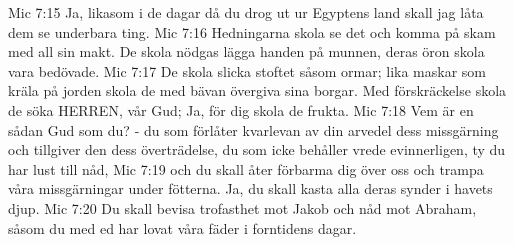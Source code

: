 Mic 7:15  Ja, likasom i de dagar då du drog ut ur Egyptens land skall jag låta dem se underbara ting.
Mic 7:16  Hedningarna skola se det och komma på skam med all sin makt. De skola nödgas lägga handen på munnen, deras öron skola vara bedövade.
Mic 7:17  De skola slicka stoftet såsom ormar; lika maskar som kräla på jorden skola de med bävan övergiva sina borgar. Med förskräckelse skola de söka HERREN, vår Gud; Ja, för dig skola de frukta.
Mic 7:18  Vem är en sådan Gud som du? - du som förlåter kvarlevan av din arvedel dess missgärning och tillgiver den dess överträdelse, du som icke behåller vrede evinnerligen, ty du har lust till nåd,
Mic 7:19  och du skall åter förbarma dig över oss och trampa våra missgärningar under fötterna. Ja, du skall kasta alla deras synder i havets djup.
Mic 7:20  Du skall bevisa trofasthet mot Jakob och nåd mot Abraham, såsom du med ed har lovat våra fäder i forntidens dagar.


